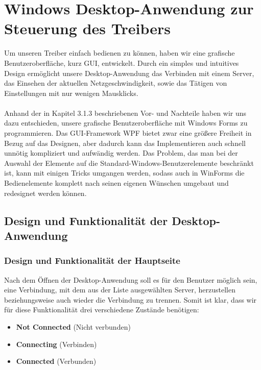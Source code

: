 \chapter{Windows Desktop-Anwendung zur Steuerung des Treibers}
\label{chap:WindowsDesktop-AnwendungzurSteuerungdesTreibers}

\lstset{basicstyle=\normalsize}

Um unseren Treiber einfach bedienen zu können, haben wir eine grafische Benutzeroberfläche, kurz GUI, entwickelt. Durch ein simples und intuitives Design ermöglicht unsere Desktop-Anwendung das Verbinden mit einem Server, das Einsehen der aktuellen Netzgeschwindigkeit, sowie das Tätigen von Einstellungen mit nur wenigen Mausklicks. 
\\ \ \\
Anhand der in Kapitel 3.1.3 beschriebenen Vor- und Nachteile haben wir uns dazu entschieden, unsere grafische Benutzeroberfläche mit Windows Forms zu programmieren.
Das GUI-Framework WPF bietet zwar eine größere Freiheit in Bezug auf das Designen, aber dadurch kann das Implementieren auch schnell unnötig kompliziert und aufwändig werden. Das Problem, das man bei der Auswahl der Elemente auf die Standard-Windows-Benutzerelemente beschränkt ist, kann mit einigen Tricks umgangen werden, sodass auch in WinForms die Bedienelemente komplett nach seinen eigenen Wünschen umgebaut und redesignet werden können.

\section{Design und Funktionalität der Desktop-Anwendung}

\subsection{Design und Funktionalität der Hauptseite}

Nach dem Öffnen der Desktop-Anwendung soll es für den Benutzer möglich sein, eine Verbindung, mit dem aus der Liste ausgewählten Server, herzustellen beziehungsweise auch wieder die Verbindung zu trennen. Somit ist klar, dass wir für diese Funktionalität drei verschiedene Zustände benötigen:
\\
\begin{itemize}
 \item \textbf{Not Connected} (Nicht verbunden)
 \item \textbf{Connecting} (Verbinden)
 \item \textbf{Connected} (Verbunden)
\end{itemize}
\bigskip

